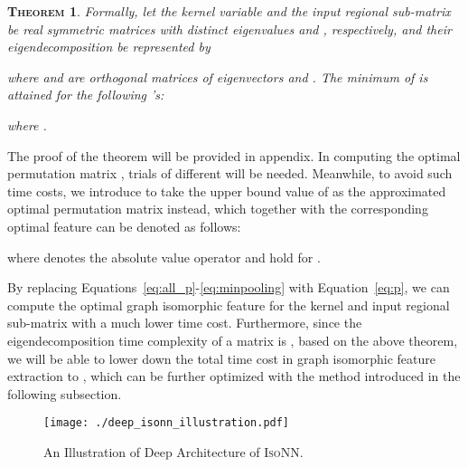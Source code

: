 \documentclass{article} \usepackage{iclr2020_conference,times}
\newtheorem{theo}{\textsc{Theorem}}
\newcommand{\our}{\textsc{IsoNN}}
\begin{document}
\begin{theo}\label{theo1}
	Formally, let the kernel variable  and the input regional sub-matrix  be  real symmetric matrices with  distinct eigenvalues  and , respectively, and their eigendecomposition be represented by 
	 
	where  and  are orthogonal matrices of eigenvectors and . The minimum of  is attained for the following 's:
	 
	where .
\end{theo}
\vspace*{-5pt}
The proof of the theorem will be provided in appendix. In computing the optimal permutation matrix , trials of different  will be needed. Meanwhile, to avoid such time costs, we introduce to take the upper bound value of  as the approximated optimal permutation matrix instead, which together with the corresponding optimal feature  can be denoted as follows:

where  denotes the absolute value operator and  hold for . 

By replacing Equations~\ref{eq:all_p}-\ref{eq:minpooling} with Equation~\ref{eq:p}, we can compute the optimal graph isomorphic feature for the kernel  and input regional sub-matrix  with a much lower time cost. Furthermore, since the eigendecomposition time complexity of a  matrix is , based on the above theorem, we will be able to lower down the total time cost in graph isomorphic feature extraction to , which can be further optimized with the method introduced in the following subsection.



\begin{figure*}
	\vspace*{-20pt}
	\centering
\texttt{[image: ./deep\_isonn\_illustration.pdf]}
		\vspace{-10pt}
	\caption{An Illustration of Deep Architecture of {\our}.} 
	\label{fig:deep_layer_example}
		\vspace*{-10pt}
\end{figure*} 
\end{document}
